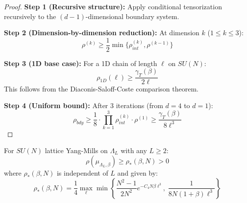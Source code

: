 \begin{proof}
\textbf{Step 1 (Recursive structure):}
Apply conditional tensorization recursively to the $(d-1)$-dimensional boundary system.

\textbf{Step 2 (Dimension-by-dimension reduction):}
At dimension $k$ ($1 \leq k \leq 3$):
\begin{equation}
\rho^{(k)} \geq \frac{1}{2} \min\{\rho_{int}^{(k)}, \rho^{(k-1)}\}
\end{equation}

\textbf{Step 3 (1D base case):}
For a 1D chain of length $\ell$ on $SU(N)$:
\begin{equation}
\rho_{1D}(\ell) \geq \frac{\gamma_T(\beta)}{2\ell}
\end{equation}
This follows from the Diaconis-Saloff-Coste comparison theorem.

\textbf{Step 4 (Uniform bound):}
After 3 iterations (from $d=4$ to $d=1$):
\begin{equation}
\rho_{bdy} \geq \frac{1}{8} \cdot \prod_{k=1}^{3} \rho_{int}^{(k)} \cdot \rho^{(1)} \geq \frac{\gamma_T(\beta)}{8\ell^3}
\end{equation}
\end{proof}

\begin{theorem}
\label{thm:uniform_lsi_main}
For $SU(N)$ lattice Yang-Mills on $\Lambda_L$ with any $L \geq 2$:
\begin{equation}
\rho(\mu_{\Lambda_L, \beta}) \geq \rho_*(\beta, N) > 0
\end{equation}
where $\rho_*(\beta, N)$ is independent of $L$ and given by:
\begin{equation}
\rho_*(\beta, N) = \frac{1}{4} \max_{\ell} \min\left\{\frac{N^2-1}{2N^2} e^{-C_4 N\beta \ell^3}, \; \frac{1}{8N(1+\beta)\ell^3}\right\}
\end{equation}
\end{theorem}

